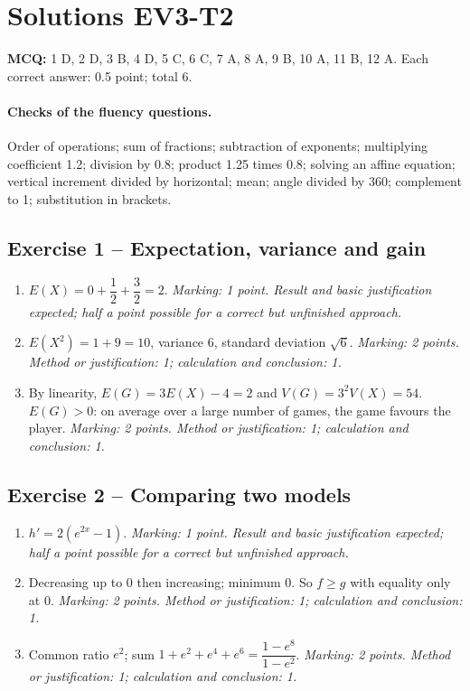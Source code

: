 \mxnewpage\section*{Solutions EV3-T2}\label{EV3-T2-CORR}
\textbf{MCQ:} 1 D, 2 D, 3 B, 4 D, 5 C, 6 C, 7 A, 8 A, 9 B, 10 A, 11 B, 12 A. Each correct answer: \num{0,5} point; total 6.
\paragraph{Checks of the fluency questions.} Order of operations; sum of fractions; subtraction of exponents; multiplying coefficient \num{1,2}; division by \num{0,8}; product \num{1,25} times \num{0,8}; solving an affine equation; vertical increment divided by horizontal; mean; angle divided by 360; complement to 1; substitution in brackets.
\subsection*{Exercise 1 -- Expectation, variance and gain}
\begin{enumerate}
\item $E(X)=0+\dfrac{1}{2}+\dfrac{3}{2}=2$. \textit{Marking: 1 point. Result and basic justification expected; half a point possible for a correct but unfinished approach.}
\item $E(X^2)=1+9=10$, variance 6, standard deviation $\sqrt6$. \textit{Marking: 2 points. Method or justification: 1; calculation and conclusion: 1.}
\item By linearity, $E(G)=3E(X)-4=2$ and $V(G)=3^2V(X)=54$. $E(G)>0$: on average over a large number of games, the game favours the player. \textit{Marking: 2 points. Method or justification: 1; calculation and conclusion: 1.}
\end{enumerate}
\subsection*{Exercise 2 -- Comparing two models}
\begin{enumerate}
\item $h\prime=2(e^{2x}-1)$. \textit{Marking: 1 point. Result and basic justification expected; half a point possible for a correct but unfinished approach.}
\item Decreasing up to 0 then increasing; minimum 0. So $f\geq g$ with equality only at 0. \textit{Marking: 2 points. Method or justification: 1; calculation and conclusion: 1.}
\item Common ratio $e^2$; sum $1+e^2+e^4+e^6=\dfrac{1-e^8}{1-e^2}$. \textit{Marking: 2 points. Method or justification: 1; calculation and conclusion: 1.}
\end{enumerate}
